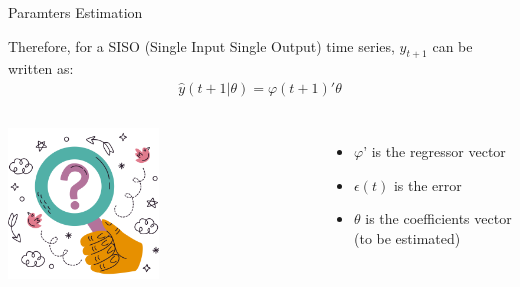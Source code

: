 \documentclass[aspectratio=169,hyperref={pdfpagelabels=false}]{beamer}
\begin{document}
\begin{frame}{Paramters Estimation}
    \begin{block}{}
    Therefore, for a SISO (Single Input Single Output) time series, $y_{t+1}$ can be written as: 
    \begin{align*}
      \hat{y}(t+1|\theta) = \varphi(t+1)'\theta
    \end{align*}  
    
  \end{block}
\end{frame}

\begin{frame}{}
    \begin{columns}
    \includegraphics[width=0.5\textwidth]{img/pic5.png} \centering \pause
    

    \begin{itemize}
      \item $\varphi$' is the regressor vector 
      \item $\epsilon(t)$ is the error \pause
      \item $\theta$ is the coefficients vector (to be estimated)
    \end{itemize}
    \end{columns}
\end{frame}
\end{document}
